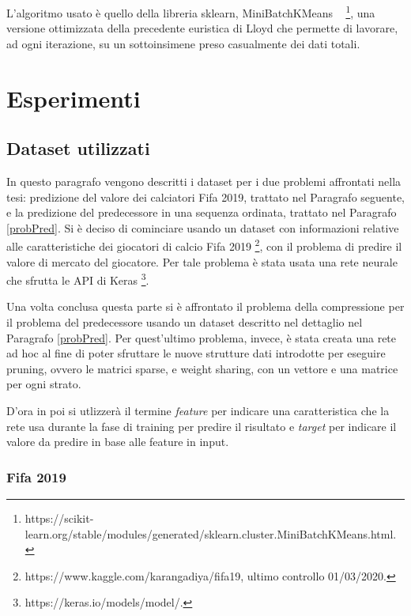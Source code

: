 \documentclass[12pt]{report}
\begin{document}
L’algoritmo usato è quello della libreria sklearn, MiniBatchKMeans ~\cite{KMeansMiniBatch} \footnote{https://scikit-learn.org/stable/modules/generated/sklearn.cluster.MiniBatchKMeans.html.}, una versione ottimizzata della precedente euristica di Lloyd che permette di lavorare, ad ogni iterazione, su un sottoinsimene preso casualmente dei dati totali.


\chapter{Esperimenti}

\section{Dataset utilizzati}
In questo paragrafo vengono descritti i dataset per i due problemi affrontati nella tesi: predizione del valore dei calciatori Fifa 2019, trattato nel Paragrafo seguente, e la predizione del predecessore in una sequenza ordinata, trattato nel Paragrafo \ref{probPred}.
Si è deciso di cominciare usando un dataset con informazioni relative alle caratteristiche dei giocatori di calcio Fifa 2019 \footnote{https://www.kaggle.com/karangadiya/fifa19, ultimo controllo 01/03/2020.}, con il problema di predire il valore di mercato del giocatore. Per tale problema è stata usata una rete neurale che sfrutta le API di Keras \footnote{https://keras.io/models/model/.}.

Una volta conclusa questa parte si è affrontato il problema della compressione per il problema del predecessore usando un dataset descritto nel dettaglio nel Paragrafo \ref{probPred}. Per quest'ultimo problema, invece, è stata creata una rete ad hoc al fine di poter sfruttare le nuove strutture dati introdotte per eseguire pruning, ovvero le matrici sparse, e weight sharing, con un vettore e una matrice per ogni strato.

D'ora in poi si utlizzerà il termine \textit{feature} per indicare una caratteristica che la rete usa durante la fase di training per predire il risultato e \textit{target} per indicare il valore da predire in base alle feature in input.

\subsection{Fifa 2019}
\end{document}
